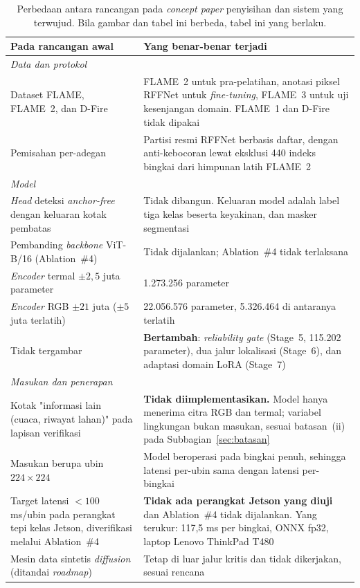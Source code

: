 \begin{table}[!htbp]
\centering
\small
\begin{tabular}{p{4.6cm}p{7.6cm}}
\hline
\textbf{Pada rancangan awal} & \textbf{Yang benar-benar terjadi} \\
\hline
\multicolumn{2}{l}{\emph{Data dan protokol}} \\
Dataset FLAME, FLAME~2, dan D-Fire &
FLAME~2 untuk pra-pelatihan, anotasi piksel RFFNet untuk \emph{fine-tuning},
FLAME~3 untuk uji kesenjangan domain. FLAME~1 dan D-Fire tidak dipakai \\
Pemisahan per-adegan &
Partisi resmi RFFNet berbasis daftar, dengan anti-kebocoran lewat eksklusi 440
indeks bingkai dari himpunan latih FLAME~2 \\
\hline
\multicolumn{2}{l}{\emph{Model}} \\
\emph{Head} deteksi \emph{anchor-free} dengan keluaran kotak pembatas &
Tidak dibangun. Keluaran model adalah label tiga kelas beserta keyakinan, dan
masker segmentasi \\
Pembanding \emph{backbone} ViT-B/16 (Ablation~\#4) &
Tidak dijalankan; Ablation~\#4 tidak terlaksana \\
\emph{Encoder} termal $\pm 2{,}5$ juta parameter &
1.273.256 parameter \\
\emph{Encoder} RGB $\pm 21$ juta ($\pm 5$ juta terlatih) &
22.056.576 parameter, 5.326.464 di antaranya terlatih \\
Tidak tergambar &
\textbf{Bertambah}: \emph{reliability gate} (Stage~5, 115.202 parameter), dua
jalur lokalisasi (Stage~6), dan adaptasi domain LoRA (Stage~7) \\
\hline
\multicolumn{2}{l}{\emph{Masukan dan penerapan}} \\
Kotak "informasi lain (cuaca, riwayat lahan)" pada lapisan verifikasi &
\textbf{Tidak diimplementasikan.} Model hanya menerima citra RGB dan termal;
variabel lingkungan bukan masukan, sesuai batasan~(ii) pada
Subbagian~\ref{sec:batasan} \\
Masukan berupa ubin $224 \times 224$ &
Model beroperasi pada bingkai penuh, sehingga latensi per-ubin sama dengan
latensi per-bingkai \\
Target latensi $<100$ ms/ubin pada perangkat tepi kelas Jetson, diverifikasi
melalui Ablation~\#4 &
\textbf{Tidak ada perangkat Jetson yang diuji} dan Ablation~\#4 tidak
dijalankan. Yang terukur: 117{,}5 ms per bingkai, ONNX fp32, laptop Lenovo
ThinkPad T480 \\
Mesin data sintetis \emph{diffusion} (ditandai \emph{roadmap}) &
Tetap di luar jalur kritis dan tidak dikerjakan, sesuai rencana \\
\hline
\end{tabular}
\caption{Perbedaan antara rancangan pada \emph{concept paper} penyisihan dan
sistem yang terwujud. Bila gambar dan tabel ini berbeda, tabel ini yang
berlaku.}
\label{tab:perubahan}
\end{table}

